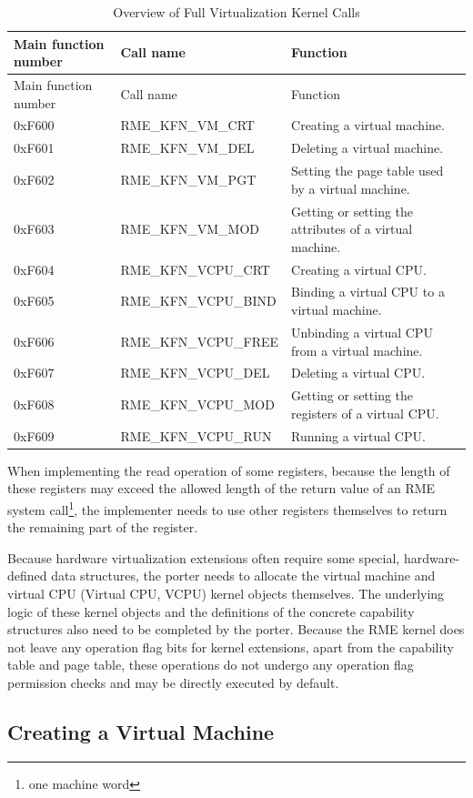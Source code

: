 \begin{xltabular}{\textwidth}{@{}>{\hsize\raggedright\arraybackslash}X>{\hsize\raggedright\arraybackslash}X>{\hsize\raggedright\arraybackslash}X@{}}
\caption{Overview of Full Virtualization Kernel Calls}\label{tab:8-72-full-virtualization-kernel-calls}\\
\toprule
Main function number & Call name & Function\tabularnewline
\endfirsthead
\toprule
Main function number & Call name & Function\tabularnewline
\midrule
\endhead
\bottomrule
\endlastfoot
0xF600 & RME\_KFN\_VM\_CRT & Creating a virtual machine.\tabularnewline
0xF601 & RME\_KFN\_VM\_DEL & Deleting a virtual machine.\tabularnewline
0xF602 & RME\_KFN\_VM\_PGT & Setting the page table used by a virtual machine.\tabularnewline
0xF603 & RME\_KFN\_VM\_MOD & Getting or setting the attributes of a virtual machine.\tabularnewline
0xF604 & RME\_KFN\_VCPU\_CRT & Creating a virtual CPU.\tabularnewline
0xF605 & RME\_KFN\_VCPU\_BIND & Binding a virtual CPU to a virtual machine.\tabularnewline
0xF606 & RME\_KFN\_VCPU\_FREE &
Unbinding a virtual CPU from a virtual machine.\tabularnewline
0xF607 & RME\_KFN\_VCPU\_DEL & Deleting a virtual CPU.\tabularnewline
0xF608 & RME\_KFN\_VCPU\_MOD &
Getting or setting the registers of a virtual CPU.\tabularnewline
0xF609 & RME\_KFN\_VCPU\_RUN & Running a virtual CPU.\tabularnewline
\end{xltabular}
\nopagebreak[4]

When implementing the read operation of some registers, because the length of these registers may exceed the allowed length of the return value of an RME system call\footnote{one machine word}, the implementer needs to use other registers themselves to return the remaining part of the register.

Because hardware virtualization extensions often require some special, hardware-defined data structures, the porter needs to allocate the virtual machine and virtual CPU (Virtual
CPU, VCPU) kernel objects themselves. The underlying logic of these kernel objects and the definitions of the concrete capability structures also need to be completed by the porter. Because the RME kernel does not leave any operation flag bits for kernel extensions, apart from the capability table and page table, these operations do not undergo any operation flag permission checks and may be directly executed by default.

\subsection{Creating a Virtual Machine}\label{subsec:8-create-virtual-machine}


